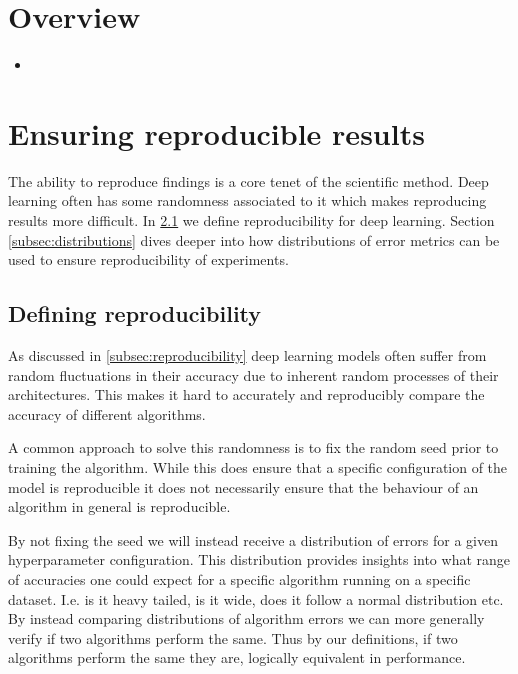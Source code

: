 


\graphicspath{{3/figures/}}


\section{Overview}
\begin{itemize}
\item 
\end{itemize}


\section{Ensuring reproducible results}
\label{"sec:reproducibility"}
The ability to reproduce findings is a core tenet of the scientific method. Deep learning often has some randomness associated to it which makes reproducing results more difficult. In \ref{subsec:defining_reproducibility} we define reproducibility for deep learning. Section \ref{subsec:distributions} dives deeper into how distributions of error metrics can be used to ensure reproducibility of experiments.

\subsection{Defining reproducibility}
\label{subsec:defining_reproducibility}
As discussed in \ref{subsec:reproducibility} deep learning models often suffer from random fluctuations in their accuracy due to inherent random processes of their architectures. This makes it hard to accurately and reproducibly compare the accuracy of different algorithms. 

A common approach to solve this randomness is to fix the random seed prior to training the algorithm. While this does ensure that a specific configuration of the model is reproducible it does not necessarily ensure that the behaviour of an algorithm in general is reproducible.

By not fixing the seed we will instead receive a distribution of errors for a given hyperparameter configuration. This distribution provides insights into what range of accuracies one could expect for a specific algorithm running on a specific dataset. I.e. is it heavy tailed, is it wide, does it follow a normal distribution etc. By instead comparing distributions of algorithm errors we can more generally verify if two algorithms perform the same. Thus by our definitions, if two algorithms perform the same they are, logically equivalent in performance. 

